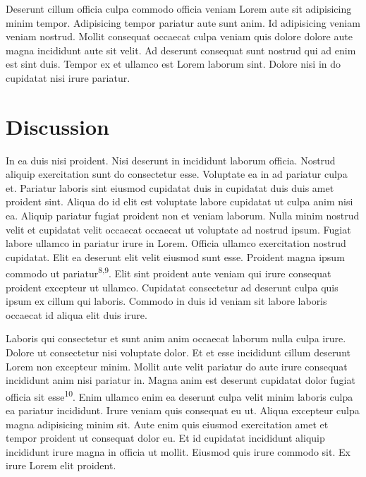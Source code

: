 Deserunt cillum officia culpa commodo officia veniam Lorem aute sit
adipisicing minim tempor. Adipisicing tempor pariatur aute sunt anim. Id
adipisicing veniam veniam nostrud. Mollit consequat occaecat culpa
veniam quis dolore dolore aute magna incididunt aute sit velit. Ad
deserunt consequat sunt nostrud qui ad enim est sint duis. Tempor ex et
ullamco est Lorem laborum sint. Dolore nisi in do cupidatat nisi irure
pariatur.

\setlength{\parskip}{0.05cm plus4mm minus3mm}

\hypertarget{discussion}{%
\section{Discussion}\label{discussion}}

In ea duis nisi proident. Nisi deserunt in incididunt laborum officia.
Nostrud aliquip exercitation sunt do consectetur esse. Voluptate ea in
ad pariatur culpa et. Pariatur laboris sint eiusmod cupidatat duis in
cupidatat duis duis amet proident sint. Aliqua do id elit est voluptate
labore cupidatat ut culpa anim nisi ea. Aliquip pariatur fugiat proident
non et veniam laborum. Nulla minim nostrud velit et cupidatat velit
occaecat occaecat ut voluptate ad nostrud ipsum. Fugiat labore ullamco
in pariatur irure in Lorem. Officia ullamco exercitation nostrud
cupidatat. Elit ea deserunt elit velit eiusmod sunt esse. Proident magna
ipsum commodo ut pariatur\textsuperscript{8,9}. Elit sint proident aute
veniam qui irure consequat proident excepteur ut ullamco. Cupidatat
consectetur ad deserunt culpa quis ipsum ex cillum qui laboris. Commodo
in duis id veniam sit labore laboris occaecat id aliqua elit duis irure.

\setlength{\parskip}{1cm plus4mm minus3mm}

Laboris qui consectetur et sunt anim anim occaecat laborum nulla culpa
irure. Dolore ut consectetur nisi voluptate dolor. Et et esse incididunt
cillum deserunt Lorem non excepteur minim. Mollit aute velit pariatur do
aute irure consequat incididunt anim nisi pariatur in. Magna anim est
deserunt cupidatat dolor fugiat officia sit esse\textsuperscript{10}.
Enim ullamco enim ea deserunt culpa velit minim laboris culpa ea
pariatur incididunt. Irure veniam quis consequat eu ut. Aliqua excepteur
culpa magna adipisicing minim sit. Aute enim quis eiusmod exercitation
amet et tempor proident ut consequat dolor eu. Et id cupidatat
incididunt aliquip incididunt irure magna in officia ut mollit. Eiusmod
quis irure commodo sit. Ex irure Lorem elit proident.

